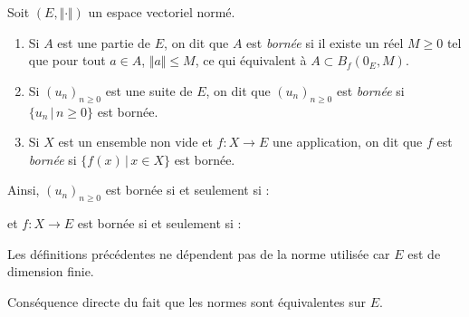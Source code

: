 \documentclass[french,11pt,twoside]{VcCours}
\begin{document}
\begin{Definition}{}
Soit $(E, \Vert \cdot \Vert)$ un espace vectoriel normé.

\begin{enumerate}
\item Si $A$ est une partie de $E$, on dit que $A$ est \emph{bornée} si il existe un réel $M \geq 0$ tel que pour tout $a \in A$, $\Vert a \Vert \leq M$, ce qui équivalent à $A \subset B_f(0_E,M)$.
\item Si $(u_n)_{n \geq 0}$ est une suite de $E$, on dit que $(u_n)_{n \geq 0}$ est \emph{bornée} si $\lbrace u_n \, \vert \, n \geq 0\rbrace$ est bornée.

\item Si $X$ est un ensemble non vide et $f : X \rightarrow E$ une application, on dit que $f$ est \emph{bornée} si $\lbrace f(x) \, \vert \, x \in X \rbrace$ est bornée.
\end{enumerate}
\end{Definition}

\medskip

Ainsi, $(u_n)_{n \geq 0}$ est bornée si et seulement si :

\vspace{1cm}

et $f : X \rightarrow E$ est bornée si et seulement si :

\vspace{1.3cm}

\begin{Theoreme}{} Les définitions précédentes ne dépendent pas de la norme utilisée car $E$ est de dimension finie.
\end{Theoreme}

\begin{Demonstration}{} Conséquence directe du fait que les normes sont équivalentes sur $E$.
\end{Demonstration}

\medskip
\end{document}
